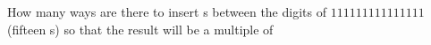 How many ways are there to insert s between the digits of $111111111111111$ (fifteen s) so that the result will be a multiple of 